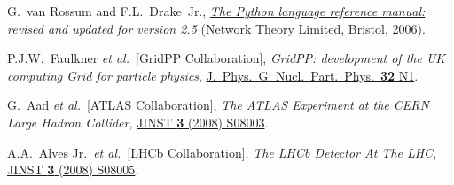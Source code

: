 \documentclass{elsart}
\def\etal {\textit{et al.}}
\begin{document}
\begin{thebibliography}{00}

G.~van Rossum and F.L.~Drake~Jr.,
\href{http://www.network-theory.co.uk/python/language/}
{\textit{The Python language reference manual: revised and updated for version
2.5}} (Network Theory Limited, Bristol, 2006).

P.J.W.~Faulkner \etal\ [GridPP Collaboration],
\textit{GridPP: development of the UK computing Grid for particle physics},
\href{http://dx.doi.org/10.1088/0954-3899/32/1/N01}
{J.~Phys.\ G: Nucl.\ Part.\ Phys.\ \textbf{32} N1}.

G.~Aad \etal\ [ATLAS Collaboration],
\textit{The ATLAS Experiment at the CERN Large Hadron Collider},
\href{http://dx.doi.org/10.1088/1748-0221/3/08/S08003}
{JINST {\bf 3} (2008) S08003}.


A.A.~Alves Jr.\ \etal\ [LHCb Collaboration],
\textit{The LHCb Detector At The LHC},
\href{http://dx.doi.org/10.1088/1748-0221/3/08/S08005}
{JINST {\bf 3} (2008) S08005}.



\end{thebibliography}
\end{document}
